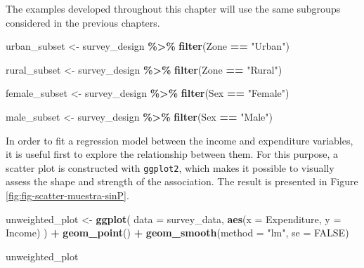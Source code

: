 \documentclass[
  english,
  12pt,
]{book}
\newenvironment{Shaded}{\begin{snugshade}}{\end{snugshade}}
\newcommand{\AttributeTok}[1]{\textcolor[rgb]{0.13,0.29,0.53}{#1}}
\newcommand{\ConstantTok}[1]{\textcolor[rgb]{0.56,0.35,0.01}{#1}}
\newcommand{\FunctionTok}[1]{\textcolor[rgb]{0.13,0.29,0.53}{\textbf{#1}}}
\newcommand{\NormalTok}[1]{#1}
\newcommand{\OtherTok}[1]{\textcolor[rgb]{0.56,0.35,0.01}{#1}}
\newcommand{\SpecialCharTok}[1]{\textcolor[rgb]{0.81,0.36,0.00}{\textbf{#1}}}
\newcommand{\StringTok}[1]{\textcolor[rgb]{0.31,0.60,0.02}{#1}}
\begin{document}
The examples developed throughout this chapter will use the same subgroups considered in the previous chapters.

\begin{Shaded}
\begin{Highlighting}[]
\NormalTok{urban\_subset }\OtherTok{\textless{}{-}}\NormalTok{ survey\_design }\SpecialCharTok{\%\textgreater{}\%}
  \FunctionTok{filter}\NormalTok{(Zone }\SpecialCharTok{==} \StringTok{"Urban"}\NormalTok{)}

\NormalTok{rural\_subset }\OtherTok{\textless{}{-}}\NormalTok{ survey\_design }\SpecialCharTok{\%\textgreater{}\%}
  \FunctionTok{filter}\NormalTok{(Zone }\SpecialCharTok{==} \StringTok{"Rural"}\NormalTok{)}

\NormalTok{female\_subset }\OtherTok{\textless{}{-}}\NormalTok{ survey\_design }\SpecialCharTok{\%\textgreater{}\%}
  \FunctionTok{filter}\NormalTok{(Sex }\SpecialCharTok{==} \StringTok{"Female"}\NormalTok{)}

\NormalTok{male\_subset }\OtherTok{\textless{}{-}}\NormalTok{ survey\_design }\SpecialCharTok{\%\textgreater{}\%}
  \FunctionTok{filter}\NormalTok{(Sex }\SpecialCharTok{==} \StringTok{"Male"}\NormalTok{)}
\end{Highlighting}
\end{Shaded}

In order to fit a regression model between the income and expenditure variables, it is useful first to explore the relationship between them. For this purpose, a scatter plot is constructed with \texttt{ggplot2}, which makes it possible to visually assess the shape and strength of the association. The result is presented in Figure \ref{fig:fig-scatter-muestra-sinP}.

\begin{Shaded}
\begin{Highlighting}[]
\NormalTok{unweighted\_plot }\OtherTok{\textless{}{-}} \FunctionTok{ggplot}\NormalTok{(}
  \AttributeTok{data =}\NormalTok{ survey\_data,}
  \FunctionTok{aes}\NormalTok{(}\AttributeTok{x =}\NormalTok{ Expenditure, }\AttributeTok{y =}\NormalTok{ Income)}
\NormalTok{) }\SpecialCharTok{+}
  \FunctionTok{geom\_point}\NormalTok{() }\SpecialCharTok{+}
  \FunctionTok{geom\_smooth}\NormalTok{(}\AttributeTok{method =} \StringTok{"lm"}\NormalTok{, }\AttributeTok{se =} \ConstantTok{FALSE}\NormalTok{)}

\NormalTok{unweighted\_plot}
\end{Highlighting}
\end{Shaded}
\end{document}

